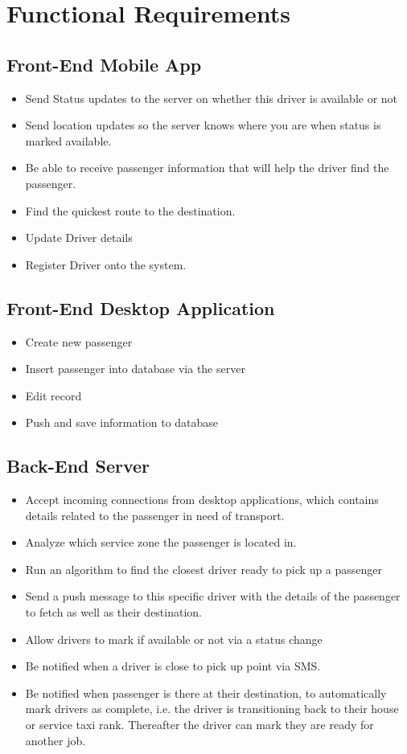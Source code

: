 \documentclass[a4paper,12pt]{article}
\begin{document}
\pagebreak
\section{Functional Requirements}
\subsection{Front-End Mobile App}
\begin{itemize}
\setlength\itemsep{0em}
\item Send Status updates to the server on whether this driver is available or not
\item Send location updates so the server knows where you are when status is marked available.
\item Be able to receive passenger information that will help the driver find the passenger.
\item Find the quickest route to the destination.
\item Update Driver details
\item Register Driver onto the system.
\end{itemize}
\subsection{Front-End Desktop Application}
\begin{itemize}
\setlength\itemsep{0em}
\item Create new passenger
\item Insert passenger into database via the server
\item Edit record
\item Push and save information to database
\end{itemize}
\subsection{Back-End Server}
\begin{itemize}
\setlength\itemsep{0em}
\item Accept incoming connections from desktop applications, which contains details related to the passenger in need of transport.
\item Analyze which service zone the passenger is located in.
\item Run an algorithm to find the closest driver ready to pick up a passenger
\item Send a push message to this specific driver with the details of the passenger to fetch as well as their destination.
\item Allow drivers to mark if available or not via a status change
\item Be notified when a driver is close to pick up point via SMS.
\item Be notified when passenger is there at their destination, to automatically mark drivers as complete, i.e. the driver is transitioning back to their house or service taxi rank. Thereafter the driver can mark they are ready for another job.
\end{itemize}
\pagebreak
\end{document}
